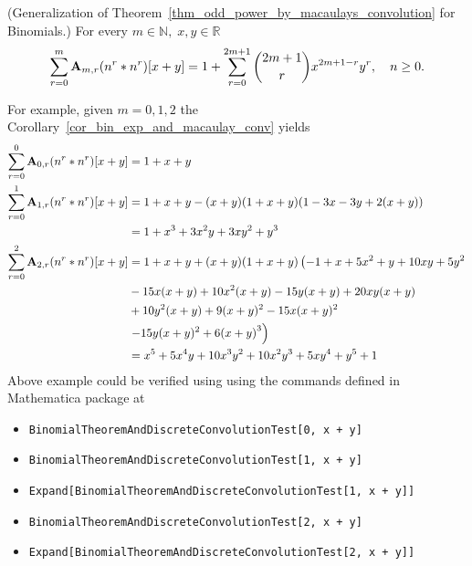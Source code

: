 \begin{cor}
    \label{cor_bin_exp_and_macaulay_conv}
    (Generalization of Theorem~\ref{thm_odd_power_by_macaulays_convolution} for Binomials.)
    For every $m\in\mathbb{N}, \; x,y\in\mathbb{R}$
    \begin{equation*}
        \sum_{r=0}^{m} {\mathbf{A}} \sb{m,r} (n \sp{r} \ast n \sp{r}) [x+y]
        =
        1 + \sum_{r=0}^{2m+1} \binom{2m+1}{r} x^{2m+1-r} y^r, \quad n\geq 0.
    \end{equation*}
\end{cor}
For example, given $m=0,1,2$ the Corollary~\ref{cor_bin_exp_and_macaulay_conv} yields
\begin{equation*}
    \begin{split}
        \sum_{r=0}^{0} {\mathbf{A}} \sb{0,r} (n \sp{r} \ast n \sp{r}) [x+y]
        &= 1 + x + y \\
        \sum_{r=0}^{1} {\mathbf{A}} \sb{1,r} (n \sp{r} \ast n \sp{r}) [x+y]
        &= 1 + x + y - (x + y) (1 + x + y) (1 - 3 x - 3 y + 2 (x + y)) \\
        &= 1 + x^3 + 3 x^2 y + 3 x y^2 + y^3\\
        \sum_{r=0}^{2} {\mathbf{A}} \sb{2,r} (n \sp{r} \ast n \sp{r}) [x+y]
        &=1 + x + y + (x + y) (1 + x + y) \left(-1 + x + 5 x^2 + y + 10 x y + 5 y^2\right. \\
        &-15 x (x + y) + 10 x^2 (x + y) - 15 y (x + y) + 20 x y (x + y) \\
        &+ 10 y^2 (x + y) +9 (x + y)^2 - 15 x (x + y)^2 \\
        &\left.-15 y (x + y)^{2} + 6 {(x + y)}^{3}\right) \\
        &=x^5 + 5 x^4 y + 10 x^3 y^2 + 10 x^2 y^3 + 5 x y^4 + y^5 + 1
    \end{split}
\end{equation*}
Above example could be verified using using the commands defined in Mathematica package at~\cite{github_source_files}
\begin{itemize}
    \item \texttt{BinomialTheoremAndDiscreteConvolutionTest[0, x + y]}
    \item \texttt{BinomialTheoremAndDiscreteConvolutionTest[1, x + y]}
    \item \texttt{Expand[BinomialTheoremAndDiscreteConvolutionTest[1, x + y]]}
    \item \texttt{BinomialTheoremAndDiscreteConvolutionTest[2, x + y]}
    \item \texttt{Expand[BinomialTheoremAndDiscreteConvolutionTest[2, x + y]]}
\end{itemize}
